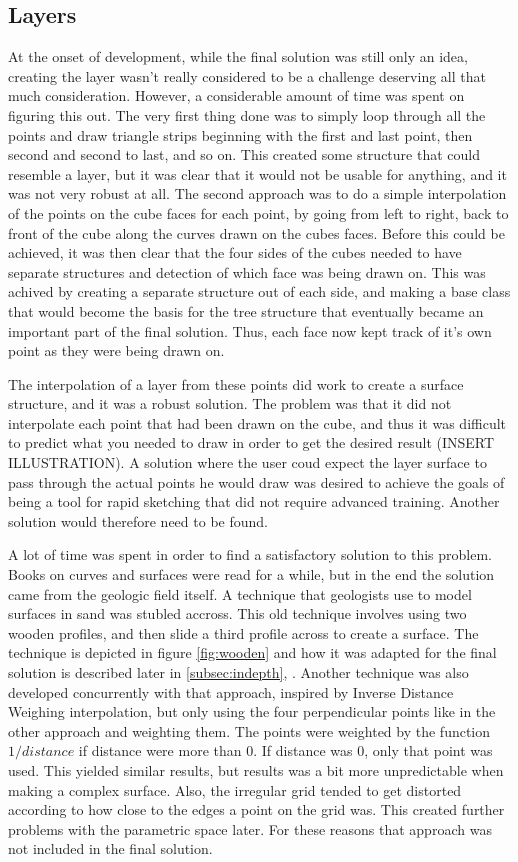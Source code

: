 \documentclass[a4paper,12pt]{report}
\newcommand{\secref}[1]{\autoref{#1}, \nameref{#1}}
\begin{document}
\subsection{Layers}
\label{subsec:layers}
At the onset of development, while the final solution was still only an idea, creating the layer wasn't really considered to be a challenge deserving all that much consideration. However, a considerable amount of time was spent on figuring this out. The very first thing done was to simply loop through all the points and draw triangle strips beginning with the first and last point, then second and second to last, and so on. This created some structure that could resemble a layer, but it was clear that it would not be usable for anything, and it was not very robust at all. The second approach was to do a simple interpolation of the points on the cube faces for each point, by going from left to right, back to front of the cube along the curves drawn on the cubes faces. Before this could be achieved, it was then clear that the four sides of the cubes needed to have separate structures and detection of which face was being drawn on. This was achived by creating a separate structure out of each side, and making a 
base class that would become the basis for the tree structure that eventually became an important part of the final solution. Thus, each face now kept track of it's own point as they were being drawn on.

The interpolation of a layer from these points did work to create a surface structure, and it was a robust solution. The problem was that it did not interpolate each point that had been drawn on the cube, and thus it was difficult to predict what you needed to draw in order to get the desired result (INSERT ILLUSTRATION). A solution where the user coud expect the layer surface to pass through the actual points he would draw was desired to achieve the goals of being a tool for rapid sketching that did not require advanced training. Another solution would therefore need to be found.

A lot of time was spent in order to find a satisfactory solution to this problem. Books on curves and surfaces were read for a while, but in the end the solution came from the geologic field itself. A technique that geologists use to model surfaces in sand was stubled accross. This old technique involves using two wooden profiles, and then slide a third profile across to create a surface. The technique is depicted in figure \ref{fig:wooden} and how it was adapted for the final solution is described later in \secref{subsec:indepth}. Another technique was also developed concurrently with that approach, inspired by Inverse Distance Weighing interpolation, but only using the four perpendicular points like in the other approach and weighting them. The points were weighted by the function $1/distance$ if distance were more than 0. If distance was 0, only that point was used. This yielded similar results, but results was a bit more unpredictable when making a complex surface. Also, the irregular grid tended to get distorted according to how close to the edges a point on the grid was. This created further problems with the parametric space later. For these reasons that approach was not included in the final solution.
\end{document}
